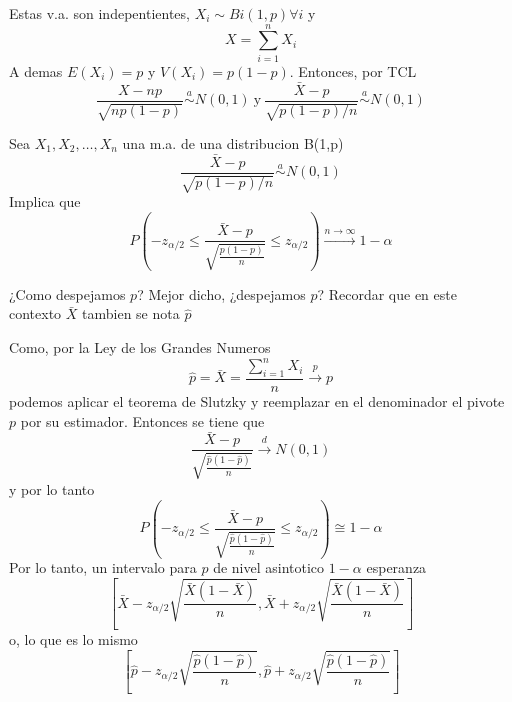 \documentclass[a4paper]{article}
\begin{document}
Estas v.a. son indepentientes, $X_i \sim Bi(1,p) \forall i$ y
\begin{equation*}
    X = \sum_{i=1}^n X_i
\end{equation*}
A demas $E(X_i) = p$ y $V(X_i) = p(1 - p)$. Entonces, por TCL
\begin{equation*}
    \frac{X - np}{\sqrt{np(1-p)}} \overset{a}{\sim} N(0,1) \ \text {y} \ \frac{\bar{X} - p}{\sqrt{p(1-p)/n}} \overset{a}{\sim} N(0,1)
\end{equation*}

Sea $X_1, X_2,\dots,X_n$ una m.a. de una distribucion B(1,p)
\begin{equation*}
    \frac{\bar{X} - p}{\sqrt{p(1-p)/n}} \overset{a}{\sim} N(0,1)
\end{equation*}
Implica que
\begin{equation*}
    P\left(-z_{\alpha/2} \leq \frac{\bar{X} - p}{\sqrt{\frac{p(1-p)}{n}}} \leq z_{\alpha/2}\right) \overset{n\rightarrow \infty}{\rightarrow} 1 - \alpha    
\end{equation*}

¿Como despejamos $p$? Mejor dicho, ¿despejamos $p$?
Recordar que en este contexto $\bar{X}$ tambien se nota $\widehat{p}$

Como, por la Ley de los Grandes Numeros
\begin{equation*}
    \widehat{p} = \bar{X} = \frac{\sum_{i=1}^n X_i}{n} \overset{p}{\rightarrow} p
\end{equation*}
podemos aplicar el teorema de Slutzky y reemplazar en el denominador el pivote $p$ por su estimador. Entonces se tiene que
\begin{equation*}
    \frac{\bar{X} - p}{\sqrt{\frac{\widehat{p}(1-\widehat{p})}{n}}} \overset{d}{\rightarrow} N(0,1)
\end{equation*}
y por lo tanto
\begin{equation*}
    P\left(-z_{\alpha/2} \leq \frac{\bar{X} - p}{\sqrt{\frac{\widehat{p}(1-\widehat{p})}{n}}} \leq z_{\alpha/2}\right) \cong 1 - \alpha    
\end{equation*}
Por lo tanto, un intervalo para $p$ de nivel asintotico $1-\alpha$ esperanza
\begin{equation*}
    \left[\bar{X} - z_{\alpha/2}\sqrt{\frac{\bar{X}(1-\bar{X})}{n}}, \bar{X} + z_{\alpha/2}\sqrt{\frac{\bar{X}(1-\bar{X})}{n}} \right]
\end{equation*}
o, lo que es lo mismo
\begin{equation*}
    \left[\widehat{p} - z_{\alpha/2}\sqrt{\frac{\widehat{p}(1-\widehat{p})}{n}}, \widehat{p} + z_{\alpha/2}\sqrt{\frac{\widehat{p}(1-\widehat{p})}{n}} \right]
\end{equation*}
\end{document}
